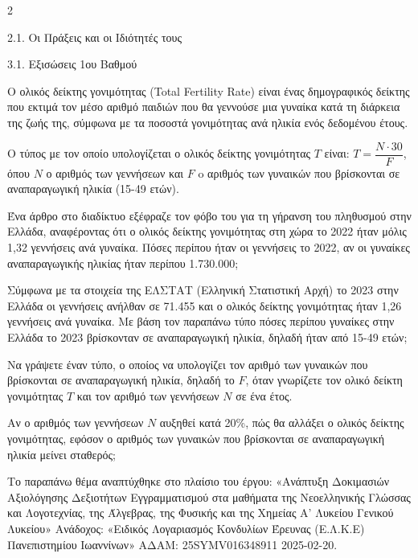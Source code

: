 \begin{ylh}{2}
    \item 2.1. Οι Πράξεις και οι Ιδιότητές τους
    \item 3.1. Εξισώσεις 1ου Βαθμού
\end{ylh}
Ο ολικός δείκτης γονιμότητας (Total Fertility Rate) είναι ένας δημογραφικός δείκτης που εκτιμά τον μέσο αριθμό παιδιών που θα γεννούσε μια γυναίκα κατά τη διάρκεια της ζωής της, σύμφωνα με τα ποσοστά γονιμότητας ανά ηλικία ενός δεδομένου έτους.

Ο τύπος με τον οποίο υπολογίζεται ο ολικός δείκτης γονιμότητας $T$ είναι: $T = \dfrac{N \cdot 30}{F}$, όπου $N$ ο αριθμός των γεννήσεων και $F$ o αριθμός των γυναικών που βρίσκονται σε αναπαραγωγική ηλικία (15-49 ετών).

\begin{alist}
\item Ένα άρθρο στο διαδίκτυο εξέφραζε τον φόβο του για τη γήρανση του πληθυσμού στην Ελλάδα, αναφέροντας ότι ο ολικός δείκτης γονιμότητας στη χώρα το 2022 ήταν μόλις 1,32 γεννήσεις ανά γυναίκα. Πόσες περίπου ήταν οι γεννήσεις το 2022, αν οι γυναίκες αναπαραγωγικής ηλικίας ήταν περίπου 1.730.000;
\item Σύμφωνα με τα στοιχεία της ΕΛΣΤΑΤ (Ελληνική Στατιστική Αρχή) το 2023 στην Ελλάδα οι γεννήσεις ανήλθαν σε 71.455 και ο ολικός δείκτης γονιμότητας ήταν 1,26 γεννήσεις ανά γυναίκα. Με βάση τον παραπάνω τύπο πόσες περίπου γυναίκες στην Ελλάδα το 2023 βρίσκονταν σε αναπαραγωγική ηλικία, δηλαδή ήταν από 15-49 ετών;
\item Να γράψετε έναν τύπο, ο οποίος να υπολογίζει τον αριθμό των γυναικών που βρίσκονται σε αναπαραγωγική ηλικία, δηλαδή το $F$, όταν γνωρίζετε τον ολικό δείκτη γονιμότητας $T$ και τον αριθμό των γεννήσεων $N$ σε ένα έτος.
\item Αν ο αριθμός των γεννήσεων $N$ αυξηθεί κατά 20\%, πώς θα αλλάξει ο ολικός δείκτης γονιμότητας, εφόσον ο αριθμός των γυναικών που βρίσκονται σε αναπαραγωγική ηλικία μείνει σταθερός;

{\footnotesize Το παραπάνω θέμα αναπτύχθηκε στο πλαίσιο του έργου: «Ανάπτυξη Δοκιμασιών Αξιολόγησης Δεξιοτήτων Εγγραμματισμού στα μαθήματα της Νεοελληνικής Γλώσσας και Λογοτεχνίας, της Άλγεβρας, της Φυσικής και της Χημείας Α' Λυκείου Γενικού Λυκείου» Ανάδοχος: «Ειδικός Λογαριασμός Κονδυλίων Έρευνας (Ε.Λ.Κ.Ε) Πανεπιστημίου Ιωαννίνων» ΑΔΑΜ: 25SYMV016348911 2025-02-20.}
\end{alist}

